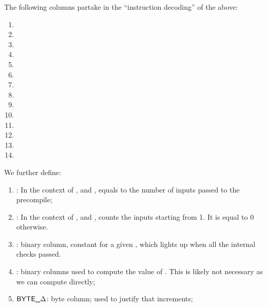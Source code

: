The following columns partake in the ``instruction decoding'' of the above:
\begin{multicols}{2}
      \begin{enumerate}
        \item \isBlsGOneAddData             
        \item \isBlsGOneAddResult           
             
        \item \isBlsGOneMsmData             
        \item \isBlsGOneMsmResult 

        \item \isBlsGTwoAddData             
        \item \isBlsGTwoAddResult   

        \item \isBlsGTwoMsmData
        \item \isBlsGTwoMsmResult

        \item \isBlsPairingCheckData
        \item \isBlsPairingCheckResult          
      
        \item \isBlsMapFpToGOneData         
        \item \isBlsMapFpToGOneResult       
      
        \item \isBlsMapFpTwoToGTwoData         
        \item \isBlsMapFpTwoToGTwoResult           
      \end{enumerate}
\end{multicols}

We further define: 

\begin{enumerate}[resume]
  \item \totalInputs:
        In the context of ,  and , equals to the number of inputs passed to the precompile;
  \item \accInputs: In the context of ,  and , counts the inputs starting from 1. It is equal to 0 otherwise.
  \item \both{\internalChecksPassed}:
        binary column, constant for a given \blsId, which lights up when all the internal checks passed.
  \item \hurdle:
        binary columns used to compute the value of \internalChecksPassed{}. This is likely not necessary as we can compute \internalChecksPassed{} directly; 
  \item $\textsf{BYTE}\textsf{\_$\Delta$}$:
        byte column; used to justify that \blsId{} increments;
\end{enumerate}

